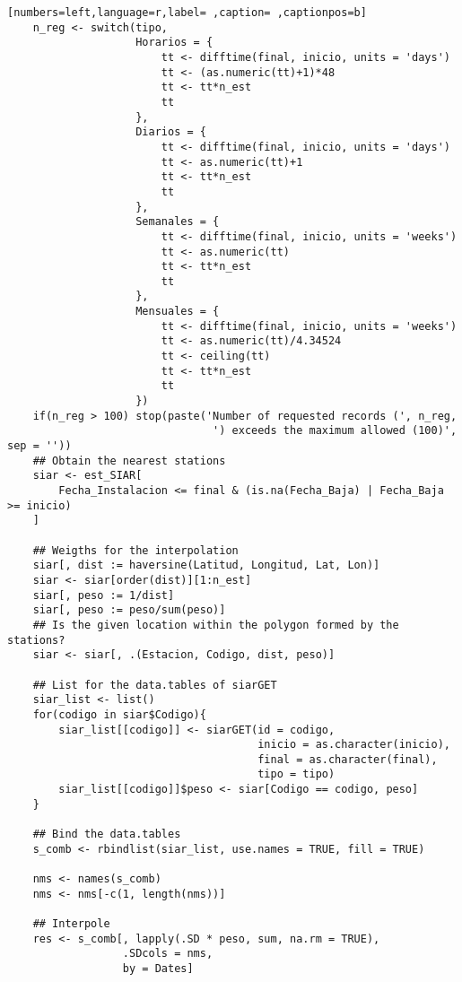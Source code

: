\begin{lstlisting}[numbers=left,language=r,label= ,caption= ,captionpos=b]
    n_reg <- switch(tipo,
                    Horarios = {
                        tt <- difftime(final, inicio, units = 'days')
                        tt <- (as.numeric(tt)+1)*48
                        tt <- tt*n_est
                        tt
                    },
                    Diarios = {
                        tt <- difftime(final, inicio, units = 'days')
                        tt <- as.numeric(tt)+1
                        tt <- tt*n_est
                        tt
                    },
                    Semanales = {
                        tt <- difftime(final, inicio, units = 'weeks')
                        tt <- as.numeric(tt)
                        tt <- tt*n_est
                        tt
                    },
                    Mensuales = {
                        tt <- difftime(final, inicio, units = 'weeks')
                        tt <- as.numeric(tt)/4.34524
                        tt <- ceiling(tt)
                        tt <- tt*n_est
                        tt
                    })
    if(n_reg > 100) stop(paste('Number of requested records (', n_reg,
                                ') exceeds the maximum allowed (100)', sep = ''))
    ## Obtain the nearest stations
    siar <- est_SIAR[
        Fecha_Instalacion <= final & (is.na(Fecha_Baja) | Fecha_Baja >= inicio)
    ]

    ## Weigths for the interpolation
    siar[, dist := haversine(Latitud, Longitud, Lat, Lon)]
    siar <- siar[order(dist)][1:n_est]
    siar[, peso := 1/dist]
    siar[, peso := peso/sum(peso)]
    ## Is the given location within the polygon formed by the stations?
    siar <- siar[, .(Estacion, Codigo, dist, peso)]

    ## List for the data.tables of siarGET
    siar_list <- list()
    for(codigo in siar$Codigo){
        siar_list[[codigo]] <- siarGET(id = codigo,
                                       inicio = as.character(inicio),
                                       final = as.character(final),
                                       tipo = tipo)
        siar_list[[codigo]]$peso <- siar[Codigo == codigo, peso]
    }

    ## Bind the data.tables
    s_comb <- rbindlist(siar_list, use.names = TRUE, fill = TRUE)

    nms <- names(s_comb)
    nms <- nms[-c(1, length(nms))]

    ## Interpole
    res <- s_comb[, lapply(.SD * peso, sum, na.rm = TRUE),
                  .SDcols = nms,
                  by = Dates]


\end{lstlisting}

